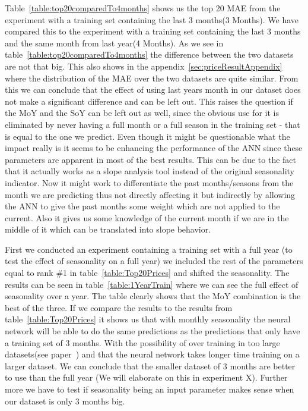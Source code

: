 Table~\ref{table:top20comparedTo4months} shows us the top 20 MAE from the experiment with a training set containing the last 3 months(3 Months). We have compared this to the experiment with a training set containing the last 3 months and the same month from last year(4 Months). As we see in table~\ref{table:top20comparedTo4months} the difference between the two datasets are not that big. This also shows in the appendix~\ref{sec:priceResultAppendix} where the distribution of the MAE over the two datasets are quite similar. From this we can conclude that the effect of using last years month in our dataset does not make a significant difference and can be left out. This raises the question if the MoY and the SoY can be left out as well, since the obvious use for it is eliminated by never having a full month or a full season in the training set - that is equal to the one we predict. Even though it might be questionable what the impact really is it seems to be enhancing the performance of the ANN since these parameters are apparent in most of the best results. This can be due to the fact that it actually works as a slope analysis tool instead of the original seasonality indicator. Now it might work to differentiate the past months/seasons from the month we are predicting thus not directly affecting it but indirectly by allowing the ANN to give the past months some weight which are not applied to the current. Also it gives us some knowledge of the current month if we are in the middle of it which can be translated into slope behavior.

First we conducted an experiment containing a training set with a full year (to test the effect of seasonality on a full year) we included the rest of the parameters equal to rank \#1 in table~\ref{table:Top20Prices} and shifted the seasonality. The results can be seen in table~\ref{table:1YearTrain} where we can see the full effect of seasonality over a year. The table clearly shows that the MoY combination is the best of the three. If we compare the results to the results from table~\ref{table:Top20Prices} it shows us that with monthly seasonality the neural network will be able to do the same predictions as the predictions that only have a training set of 3 months. With the possibility of over training in too large datasets(see paper~\cite{1}) and that the neural network takes longer time training on a larger dataset. We can conclude that the smaller dataset of 3 months are better to use than the full year (We will elaborate on this in experiment X). Further more we have to test if seasonality being an input parameter makes sense when our dataset is only 3 months big.

